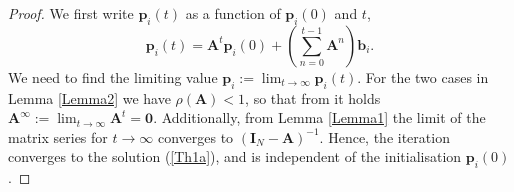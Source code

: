 \documentclass[10pt, conference, letterpaper]{IEEEtran}
\begin{document}
{\begin{proof} We first write $\mathbf{p}_i(t)$ as a function of $\mathbf{p}_i(0)$ and $t$,
\begin{equation}
\label{Pit1}
\mathbf{p}_i(t) = \mathbf{A}^{t}\mathbf{p}_i(0) + \left(\sum_{n=0}^{t-1}\mathbf{A}^n\right)\mathbf{b}_i.\nonumber
\end{equation}
We need to find the limiting value $\mathbf{p}_i:=\lim_{t\rightarrow\infty}\mathbf{p}_i(t)$. For the two cases in Lemma \ref{Lemma2} we have $\rho(\mathbf{A})<1$, so that from \cite[pp.137--138, or Theorem 5.6.12]{HornJohn} it holds $\mathbf{A}^{\infty}:=\lim_{t\rightarrow\infty}\mathbf{A}^{t} = \mathbf{0}$. Additionally, from Lemma \ref{Lemma1} the limit of the matrix series for $t\rightarrow\infty$ converges to $\left(\mathbf{I}_N-\mathbf{A}\right)^{-1}$. Hence, the iteration converges to the solution (\ref{Th1a}), and is independent of the initialisation $\mathbf{p}_i(0)$.
%
%
%
\end{proof}

}
\end{document}
